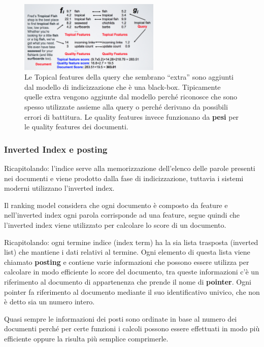 \begin{figure}[htbp]
	\centering
	\includegraphics[width=0.6\textwidth]{./images/l6-modello-2}
	\caption{Le Topical features della query che sembrano ``extra'' sono aggiunti dal modello di indicizzazione che è una black-box. Tipicamente quelle extra vengono aggiunte dal modello perché riconosce che sono spesso utilizzate assieme alla query o perché derivano da possibili errori di battitura. Le quality features invece funzionano da \textbf{pesi} per le quality features dei documenti.}
\end{figure}

\subsubsection{Inverted Index e posting}

Ricapitolando: l'indice serve alla memorizzazione dell'elenco delle parole presenti nei documenti e viene prodotto dalla fase di indicizzazione, tuttavia i sistemi moderni utilizzano l'inverted index. 


Il ranking model considera che ogni documento è composto da feature e nell'inverted index ogni parola corrisponde ad una feature, segue quindi che l'inverted index viene utilizzato per calcolare lo score di un documento.

Ricapitolando: ogni termine indice (index term) ha la sia lista trasposta (inverted list) che mantiene i dati relativi al termine.
Ogni elemento di questa lista viene chiamato \textbf{posting} e contiene varie informazioni che possono essere utilizza per calcolare in modo efficiente lo score del documento, tra queste informazioni c'è un riferimento al documento di appartenenza che prende il nome di \textbf{pointer}.
Ogni pointer fa riferimento al documento mediante il suo identificativo univico, che non è detto sia un numero intero.

Quasi sempre le informazioni dei posti sono ordinate in base al numero dei documenti perché per certe funzioni i calcoli possono essere effettuati in modo più efficiente oppure la risulta più semplice comprimerle.

